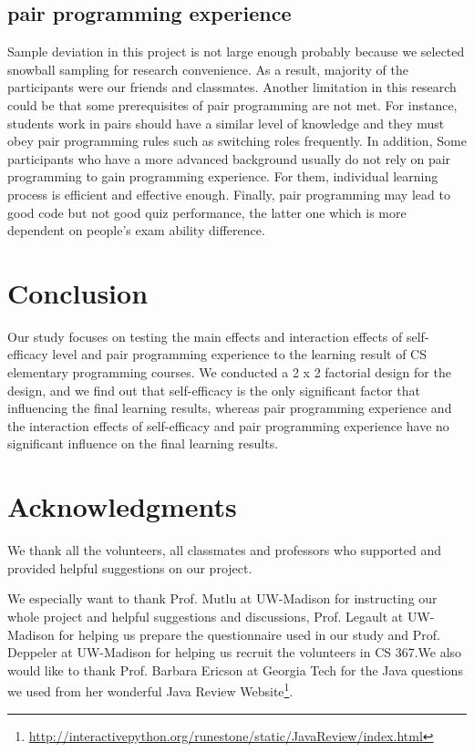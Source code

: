 \documentclass{sigchi}
\begin{document}
\subsection{pair programming experience}
Sample deviation in this project is not large enough probably because we selected snowball sampling for research convenience. As a result, majority of the participants were our friends and classmates. Another limitation in this research could be that some prerequisites of pair programming are not met.  For instance, students work in pairs should have a similar level of knowledge and they must obey pair programming rules such as switching roles frequently. In addition, Some participants who have a more advanced background usually do not rely on pair programming to gain programming experience. For them,  individual learning process is efficient and effective enough. Finally, pair programming may lead to good code but not good quiz performance, the latter one which is more dependent on people's exam ability difference.


\section{Conclusion}
Our study focuses on testing the main effects and interaction effects of self-efficacy level and pair programming experience to the learning result of CS elementary programming courses. We conducted a 2 x 2 factorial design for the design, and we find out that self-efficacy is the only significant factor that influencing the final learning results, whereas pair programming experience and the interaction effects of self-efficacy and pair programming experience have no significant influence on the final learning results.

\section{Acknowledgments}

We thank all the volunteers, all classmates and professors who supported and provided helpful suggestions on our project. 

We especially want to thank Prof. Mutlu at UW-Madison for instructing our whole project and helpful suggestions and discussions,  Prof. Legault at UW-Madison for helping us prepare the questionnaire used in our study and Prof. Deppeler at UW-Madison for helping us recruit the volunteers in CS 367.We also would like to thank Prof. Barbara Ericson at Georgia Tech for the Java questions we used from her wonderful Java Review Website\footnote{\url{http://interactivepython.org/runestone/static/JavaReview/index.html}}.
\end{document}
